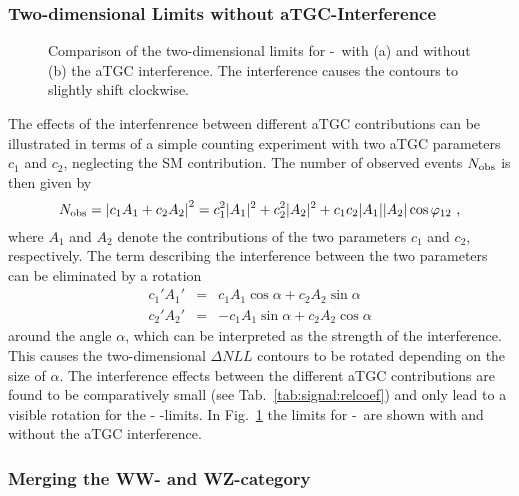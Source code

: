 \subsubsection*{Two-dimensional Limits without aTGC-Interference}
\begin{figure}
	\centering
	\caption[Comparison of the two-dimensional limits for \Tccw -\Tcb \ with and without the aTGC interference]{Comparison of the two-dimensional limits for \Tccw -\Tcb \ with (a) and without (b) the aTGC interference. The interference causes the contours to slightly shift clockwise.}
	\label{fig:limits:noatgcint}
\end{figure}
The effects of the interfenrence between different aTGC contributions can be illustrated in terms of a simple counting experiment with two aTGC parameters $c_1$ and $c_2$, neglecting the SM contribution. The number of observed events $N_{\rm obs}$ is then given by
\begin{equation}
N_{\rm obs} = \left| c_1A_1 + c_2A_2 \right|^2 = c_1^2|A_1|^2 + c_2^2|A_2|^2 + c_1c_2|A_1||A_2|\cos \varphi_{12} ~,
\end{equation}
where $A_1$ and $A_2$ denote the contributions of the two parameters $c_1$ and $c_2$, respectively. The term describing the interference between the two parameters can be eliminated by a rotation
\begin{eqnarray}
c_1'A_1' &=& c_1A_1\cos \alpha + c_2A_2\sin \alpha \\
c_2'A_2' &=& -c_1A_1\sin \alpha + c_2A_2\cos \alpha
\end{eqnarray}
around the angle $\alpha$, which can be interpreted as the strength of the interference. This causes the two-dimensional $\Delta NLL$ contours to be rotated depending on
the size of $\alpha$. The interference effects between the different aTGC contributions are found to be comparatively small (see Tab.~\ref{tab:signal:relcoef}) and only lead to a visible rotation for the \Tccw - \Tcb -limits. In Fig.~\ref{fig:limits:noatgcint} the limits for \Tccw -\Tcb \ are shown with and without the aTGC interference.


\subsubsection*{Merging the WW- and WZ-category}

